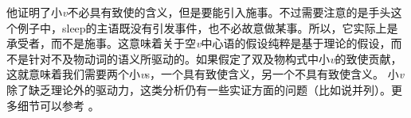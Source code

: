 他证明了小\emph{v}不必具有致使的含义，但是要能引入施事。不过需要注意的是手头这个例子中，sleep的主语既没有引发事件，也不必故意做某事。所以，它实际上是承受者，而不是施事。这意味着关于空\emph{v}中心语的假设纯粹是基于理论的假设，而不是针对不及物动词的语义所驱动的。如果假定了双及物构式中小\emph{v}的致使贡献，这就意味着我们需要两个小\emph{v}s，一个具有致使含义，另一个不具有致使含义。
%
%
小\emph{v}除了缺乏理论外的驱动力，这类分析仍有一些实证方面的问题（比如说并列）。更多细节可以参考 。

